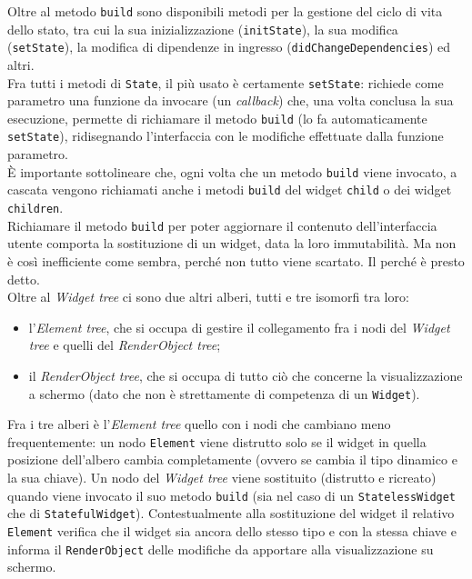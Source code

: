 Oltre al metodo \texttt{build} sono disponibili metodi per la gestione del ciclo di vita dello stato, tra cui la sua inizializzazione (\texttt{initState}), la sua modifica (\texttt{setState}), la modifica di dipendenze in ingresso (\texttt{didChangeDependencies}) ed altri.\\
Fra tutti i metodi di \texttt{State}, il più usato è certamente \texttt{setState}: richiede come parametro una funzione da invocare (un \emph{callback}) che, una volta conclusa la sua esecuzione, permette di richiamare il metodo \texttt{build} (lo fa automaticamente \texttt{setState}), ridisegnando l'interfaccia con le modifiche effettuate dalla funzione parametro.\\
È importante sottolineare che, ogni volta che un metodo \texttt{build} viene invocato, a cascata vengono richiamati anche i metodi \texttt{build} del widget \texttt{child} o dei widget \texttt{children}.\\
Richiamare il metodo \texttt{build} per poter aggiornare il contenuto dell'interfaccia utente comporta la sostituzione di un widget, data la loro immutabilità.
Ma non è così inefficiente come sembra, perché non tutto viene scartato. Il perché è presto detto.\\
Oltre al \emph{Widget tree} ci sono due altri alberi, tutti e tre isomorfi tra loro:
\begin{itemize}
    \item l'\emph{Element tree}, che si occupa di gestire il collegamento fra i nodi del \emph{Widget tree} e quelli del \emph{RenderObject tree};
    \item il \emph{RenderObject tree}, che si occupa di tutto ciò che concerne la visualizzazione a schermo (dato che non è strettamente di competenza di un \texttt{Widget}).
\end{itemize}
Fra i tre alberi è l'\emph{Element tree} quello con i nodi che cambiano meno frequentemente: un nodo \texttt{Element} viene distrutto solo se il widget in quella posizione dell'albero cambia completamente (ovvero se cambia il tipo dinamico e la sua chiave).
Un nodo del \emph{Widget tree} viene sostituito (distrutto e ricreato) quando viene invocato il suo metodo \texttt{build} (sia nel caso di un \texttt{StatelessWidget} che di \texttt{StatefulWidget}). Contestualmente alla sostituzione del widget il relativo \texttt{Element} verifica che il widget sia ancora dello stesso tipo e con la stessa chiave e informa il \texttt{RenderObject} delle modifiche da apportare alla visualizzazione su schermo.
